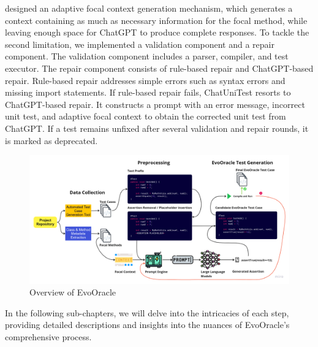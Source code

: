 designed an adaptive focal context generation mechanism, which generates a context containing as much as necessary information for the focal method, while leaving enough space for ChatGPT to produce complete responses. To tackle the second limitation, we implemented a validation component and a repair component. The validation component includes a parser, compiler, and test executor. The repair component consists of rule-based repair and ChatGPT-based repair. Rule-based repair addresses simple errors such as syntax errors and missing import statements. If rule-based repair fails, ChatUniTest resorts to ChatGPT-based repair. It constructs a prompt with an error message, incorrect unit test, and adaptive focal context to obtain the corrected unit test from ChatGPT. If a test remains unfixed after several validation and repair rounds, it is marked as deprecated.

\begin{figure}[H]
    \centering
    \includegraphics[width=1\linewidth]{images/evooracle_overview.png}
    \caption{Overview of EvoOracle}
    \label{fig:evooracle_overview}
\end{figure}



In the following sub-chapters, we will delve into the intricacies of each step, providing detailed descriptions and insights into the nuances of EvoOracle's comprehensive process.

